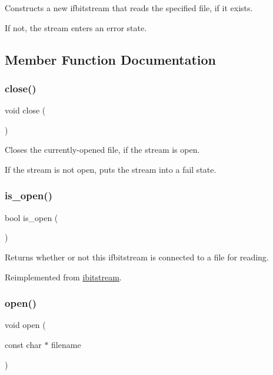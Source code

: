 Constructs a new ifbitstream that reads the specified file, if it exists. 

If not, the stream enters an error state. 

\subsection{Member Function Documentation}
\mbox{\label{classifbitstream_a5ae591df94fc66ccb85cbb6565368bca}} 
\subsubsection{\texorpdfstring{close()}{close()}}
{\footnotesize\ttfamily void close (\begin{DoxyParamCaption}{ }\end{DoxyParamCaption})}



Closes the currently-\/opened file, if the stream is open. 

If the stream is not open, puts the stream into a fail state. \mbox{\label{classifbitstream_a2f57f54d8c03b615bb31eee091d8a88a}} 
\subsubsection{\texorpdfstring{is\+\_\+open()}{is\_open()}}
{\footnotesize\ttfamily bool is\+\_\+open (\begin{DoxyParamCaption}{ }\end{DoxyParamCaption})\hspace{0.3cm}{\ttfamily [virtual]}}



Returns whether or not this ifbitstream is connected to a file for reading. 



Reimplemented from \mbox{\hyperlink{classibitstream_a2f57f54d8c03b615bb31eee091d8a88a}{ibitstream}}.

\mbox{\label{classifbitstream_a57f80da790b202b27353cd8f8415b382}} 
\subsubsection{\texorpdfstring{open()}{open()}\hspace{0.1cm}{\footnotesize\ttfamily [1/2]}}
{\footnotesize\ttfamily void open (\begin{DoxyParamCaption}\item[{const char $\ast$}]{filename }\end{DoxyParamCaption})}



